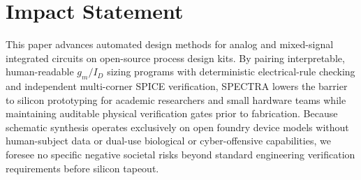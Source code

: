 \documentclass{article}
\theoremstyle{plain}
\begin{document}
\section*{Impact Statement}
This paper advances automated design methods for analog and mixed-signal integrated circuits on open-source process design kits. By pairing interpretable, human-readable $g_m/I_D$ sizing programs with deterministic electrical-rule checking and independent multi-corner SPICE verification, \textsc{SPECTRA} lowers the barrier to silicon prototyping for academic researchers and small hardware teams while maintaining auditable physical verification gates prior to fabrication. Because schematic synthesis operates exclusively on open foundry device models without human-subject data or dual-use biological or cyber-offensive capabilities, we foresee no specific negative societal risks beyond standard engineering verification requirements before silicon tapeout.




\newpage
\appendix
{}
\onecolumn

\end{document}
